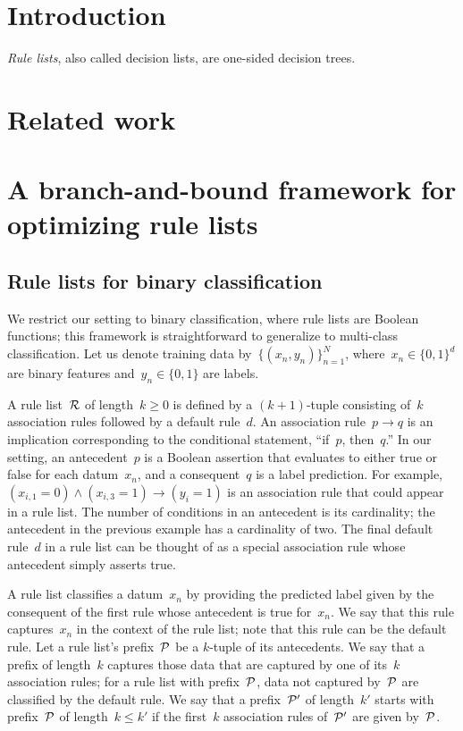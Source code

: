 \section{Introduction}

\emph{Rule lists}, also called decision lists, are one-sided decision trees.

\section{Related work}

\citep{rivest:1987}

\citep{LethamRuMcMa15}

\citep{YangRuSe16}

\citep{garofalakis:2000-kdd,garofalakis:2000-sigkdd,garofalakis:2003}

\section{A branch-and-bound framework for optimizing rule lists}

\subsection{Rule lists for binary classification}

We restrict our setting to binary classification,
where rule lists are Boolean functions;
this framework is straightforward to generalize to multi-class classification.
%
Let us denote training data by~${\{(x_n, y_n)\}_{n=1}^N}$,
where~${x_n \in \{0, 1\}^d}$ are binary features and~${y_n \in \{0, 1\}}$ are labels.

A rule list~${\mathcal R}$ of length~$k \ge 0$ is defined by a $(k+1)$-tuple consisting of~$k$
association rules followed by a default rule~$d$.
%
An association rule~${p \rightarrow q}$ is an implication corresponding to the
conditional statement, ``if~$p$, then~$q$.''
%
In our setting, an antecedent~$p$ is a Boolean assertion that evaluates to either
true or false for each datum~$x_n$, and a consequent~$q$ is a label prediction.
%
For example,~${(x_{i, 1} = 0) \wedge (x_{i, 3} = 1) \rightarrow (y_i = 1)}$
is an association rule that could appear in a rule list.
%
The number of conditions in an antecedent is its cardinality;
the antecedent in the previous example has a cardinality of two.
%
The final default rule~$d$ in a rule list can be thought of as a special
association rule whose antecedent simply asserts true.

A rule list classifies a datum~$x_n$ by providing the predicted label given
by the consequent of the first rule whose antecedent is true for~$x_n$.
%
We say that this rule captures~$x_n$ in the context of the rule list;
note that this rule can be the default rule.
%
Let a rule list's prefix~${\mathcal P}$ be a $k$-tuple of its antecedents.
%
We say that a prefix of length~$k$ captures those data that are captured
by one of its~$k$ association rules; for a rule list with prefix~${\mathcal P}$,
data not captured by~${\mathcal P}$ are classified by the default rule.
%
We say that a prefix~${\mathcal P}'$ of length~$k'$ starts with prefix~${\mathcal P}$ of
length~$k \le k'$ if the first~$k$ association rules of~${\mathcal P}'$ are given by~${\mathcal P}$.

